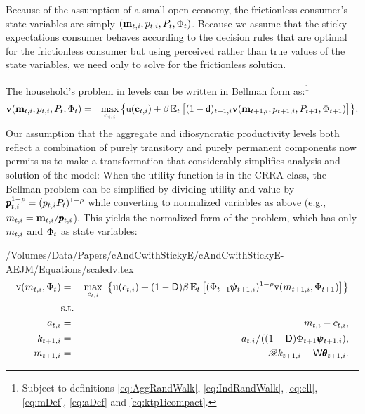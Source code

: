 \documentclass[titlepage]{./econtex}
\begin{document}
Because of the assumption of a small open economy, the frictionless consumer's state variables are simply $(\mathbf{m}_{t,i},p_{t,i},P_t,\Phi_t)$.  Because we assume that the sticky expectations consumer behaves according to the decision rules that are optimal for the frictionless consumer but using perceived rather than true values of the state variables, we need only to solve for the frictionless solution.

The household's problem in levels can be written in Bellman form as:\footnote{Subject to definitions \eqref{eq:AggRandWalk}, \eqref{eq:IndRandWalk}, \eqref{eq:ell}, \eqref{eq:mDef}, \eqref{eq:aDef} and \eqref{eq:ktp1icompact}.}
\begin{eqnarray*}
  \textbf{v}(\mathbf{m}_{t,i},p_{t,i},P_t,\Phi_t)  & = &  \max_{\mathbf{c}_{t,i}}  \big\{ {\mathrm{u}}(\mathbf{c}_{t,i}) + \beta \operatorname{\mathbb{E}}_t \big[(1-\mathsf{d})_{t+1,i}\textbf{v}(\mathbf{m}_{t+1,i},p_{t+1,i},P_{t+1},\Phi_{t+1})\big] \big\}. \nonumber
\end{eqnarray*}
Our assumption that the aggregate and idiosyncratic productivity levels both reflect a combination of purely transitory and purely permanent components now permits us to make a transformation that considerably simplifies analysis and solution of the model: When the utility function is in the CRRA class, the Bellman problem can be simplified by dividing utility and value by $\pmb{p}_{t,i}^{1-\rho} = (p_{t,i}P_t)^{1-\rho}$ while converting to normalized variables as above (e.g., $m_{t,i}=\mathbf{m}_{t,i}/\pmb{p}_{t,i}$). This yields the normalized form of the problem, which has only $m_{t,i}$ and $\Phi_t$ as state variables:
\begin{verbatimwrite}{/Volumes/Data/Papers/cAndCwithStickyE/cAndCwithStickyE-AEJM/Equations/scaledv.tex}
\begin{eqnarray}
    \mathrm{v}({m}_{t,i},\Phi_t) & = & \max_{c_{t,i}} ~ \big\{ {\mathrm{u}}(c_{t,i}) + (1-\mathsf{D}) \beta      \nonumber
                                      \operatorname{\mathbb{E}}_{t}\big[ (\Phi_{t+1} \pmb{\psi}_{t+1,i})^{1-\rho}\mathrm{v}(m_{t+1,i},\Phi_{t+1})\big] \big\}
    \label{eq:scaledv}
\\  & \mbox{s.t.} & 
\\    a_{t,i}   & = & m_{t,i} - c_{t,i}, \nonumber
\\    k_{t+1,i} & = & a_{t,i} \big/( (1-\mathsf{D}) \Phi_{t+1} \pmb{\psi}_{t+1,i} ),  \nonumber
\\    m_{t+1,i} & = & \mathscr{R} k_{t+1,i} + \mathsf{W} \pmb{\theta}_{t+1,i}.  \nonumber
\end{eqnarray}
\end{verbatimwrite}
\end{document}
